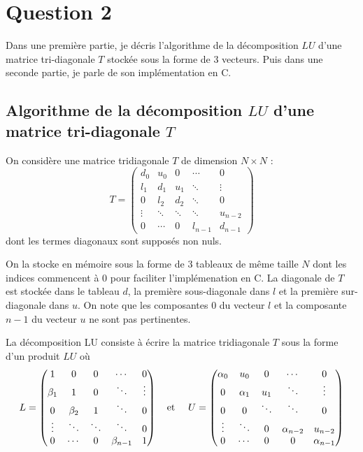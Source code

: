 \documentclass{article}
\begin{document}
\section{Question 2}

Dans une première partie, je décris l'algorithme de la décomposition $LU$ d'une matrice tri-diagonale $T$
stockée sous la forme de 3 vecteurs. Puis dans une seconde partie, je parle de son implémentation en C.

\subsection{Algorithme de la décomposition $LU$ d'une matrice tri-diagonale $T$}

On considère une matrice tridiagonale $T$ de dimension $N \times N$ :
\begin{equation}
T = \begin{pmatrix}
    d_0 & u_0 & 0 & \cdots & 0 \\
    l_1 & d_1 & u_1 & \ddots & \vdots \\
    0 & l_2 & d_2 & \ddots & 0 \\
    \vdots & \ddots & \ddots & \ddots & u_{n-2} \\
    0 & \cdots & 0 & l_{n-1} & d_{n-1}
\end{pmatrix}
\end{equation}
dont les termes diagonaux sont supposés non nuls.

On la stocke en mémoire sous la forme de 3 tableaux de même taille $N$ dont 
les indices commencent à 0 pour faciliter l'implémenation en C.
La diagonale de $T$ est stockée dans le tableau $d$, la première sous-diagonale dans $l$
et la première sur-diagonale dans $u$. On note que les composantes $0$ du vecteur $l$ et la composante $n-1$ du vecteur $u$ ne sont pas pertinentes.

La décomposition LU consiste à écrire la matrice tridiagonale $T$ sous la forme d'un produit $LU$ où
\begin{equation}
L = \begin{pmatrix}
    1 & 0 & 0 & \cdots & 0 \\
    \beta_1 & 1 & 0 & \ddots & \vdots \\
    0 & \beta_2 & 1 & \ddots & 0 \\
    \vdots & \ddots & \ddots & \ddots & 0 \\
    0 & \cdots & 0 & \beta_{n-1} & 1
\end{pmatrix}
\text{\quad et \quad}
U = \begin{pmatrix}
    \alpha_0 & u_0 & 0 & \cdots & 0 \\
    0  & \alpha_1 & u_1 & \ddots & \vdots \\
    0 & 0 &  \ddots & \ddots & 0 \\
    \vdots & \ddots & 0  &\alpha_{n-2} & u_{n-2} \\
    0 & \cdots & 0 & 0 & \alpha_{n-1}
\end{pmatrix}
\end{equation}
\end{document}
